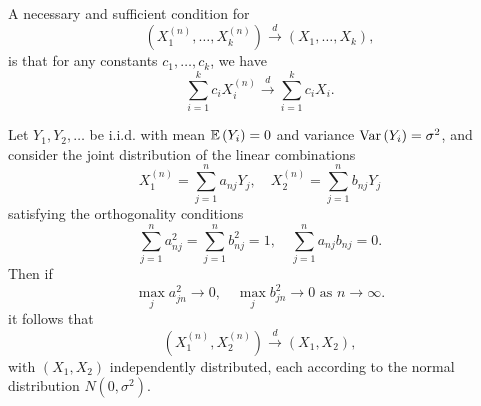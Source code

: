 \begin{theorem}
	\label{thm:multivariate-convergence-in-distribution-by-linear-combinations}
	A necessary and sufficient condition for
	\begin{equation*}
		(X_{1}^{(n)},\ldots,X_k^{(n)})\stackrel{d}{\rightarrow}(X_{1},\ldots,X_k),
	\end{equation*}
	is that for any constants $c_{1},\ldots,c_k$, we have
	\begin{equation*}
		\sum_{i=1}^{k}c_{i}X_{i}^{(n)}\stackrel{d}{\rightarrow}\sum_{i=1}^{k}c_{i}X_{i}.
	\end{equation*}
\end{theorem}

\begin{example}
	Let $Y_{1},Y_{2},\ldots$ be i.i.d. with mean ${\mathbb E}\left(Y_{i}\right)=0$ and variance $\mathrm{Var}\left(Y_{i}\right)=\sigma^2$, and consider the joint distribution of the linear combinations
	\begin{equation*}
		X_{1}^{(n)}=\sum_{j=1}^{n}a_{nj}Y_{j},\quad X_{2}^{(n)}=\sum_{j=1}^{n}b_{nj}Y_{j}
	\end{equation*}
	satisfying the orthogonality conditions
	\begin{equation}
		\label{eq:orthogonality-conditions-2}
		\sum_{j=1}^{n}a_{nj}^{2}=\sum_{j=1}^{n}b_{nj}^2=1,\quad \sum_{j=1}^{n}a_{nj}b_{nj}=0.
	\end{equation}
	Then if
	\begin{equation*}
		\max_{j}a_{jn}^{2}\rightarrow 0,\quad\max_{j}b_{jn}^2\rightarrow 0 \text { as } n \rightarrow \infty .
	\end{equation*}
	it follows that
	\begin{equation*}
		(X_{1}^{(n)},X_{2}^{(n)})\stackrel{d}{\rightarrow}(X_{1},X_{2}),
	\end{equation*}
	with $(X_{1},X_{2})$ independently distributed, each according to the normal distribution $N\left(0,\sigma^2\right)$.
\end{example}

